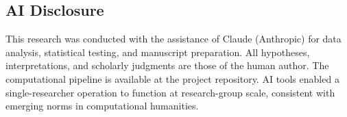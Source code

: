 \documentclass[12pt,a4paper]{article}
\begin{document}

\subsection*{AI Disclosure}

This research was conducted with the assistance of Claude (Anthropic) for data analysis, statistical testing, and manuscript preparation. All hypotheses, interpretations, and scholarly judgments are those of the human author. The computational pipeline is available at the project repository. AI tools enabled a single-researcher operation to function at research-group scale, consistent with emerging norms in computational humanities.



\end{document}
